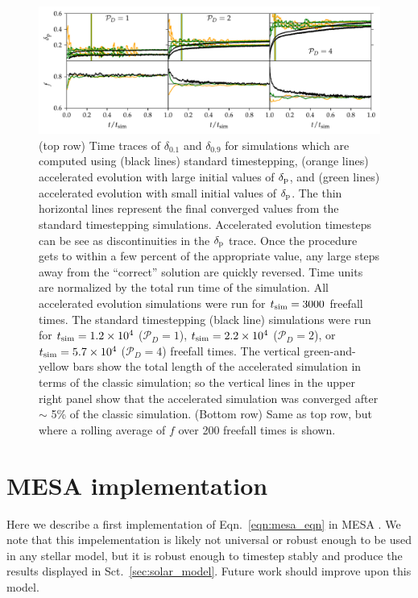 \documentclass[twocolumn]{aastex631}
\newcommand{\delp}{\ensuremath{\delta_{\rm{p}}}}
\newcommand{\mP}{\ensuremath{\mathcal{P}}}
\begin{document}
\begin{figure}[t!]
\centering
\includegraphics[width=\textwidth]{AE_time_figure.pdf}
\caption{
\label{fig:AE_time_figure}
(top row) Time traces of $\delta_{0.1}$ and $\delta_{0.9}$ for simulations which are computed using (black lines) standard timestepping, (orange lines) accelerated evolution with large initial values of $\delp$, and (green lines) accelerated evolution with small initial values of $\delp$.
The thin horizontal lines represent the final converged values from the standard timestepping simulations.
Accelerated evolution timesteps can be see as discontinuities in the $\delp$ trace.
Once the procedure gets to within a few percent of the appropriate value, any large steps away from the ``correct'' solution are quickly reversed.
Time units are normalized by the total run time of the simulation.
All accelerated evolution simulations were run for $t_{\rm{sim}} = 3000$ freefall times.
The standard timestepping (black line) simulations were run for $t_{\rm{sim}} = 1.2 \times 10^4$ ($\mP_D = 1$), $t_{\rm{sim}} = 2.2 \times 10^4$ ($\mP_D = 2$), or $t_{\rm{sim}} = 5.7 \times 10^4$ ($\mP_D = 4$) freefall times.
The vertical green-and-yellow bars show the total length of the accelerated simulation in terms of the classic simulation; so the vertical lines in the upper right panel show that the accelerated simulation was converged after $\sim$ 5\% of the classic simulation.
(Bottom row) Same as top row, but where a rolling average of $f$ over 200 freefall times is shown.
}
\end{figure}





\section{MESA implementation}
\label{app:mesa}
Here we describe a first implementation of Eqn.~\ref{eqn:mesa_eqn} in MESA \citep{paxton_etal_2011, paxton_etal_2013, paxton_etal_2015, paxton_etal_2018, paxton_etal_2019}.
We note that this impelementation is likely not universal or robust enough to be used in any stellar model, but it is robust enough to timestep stably and produce the results displayed in Sct.~\ref{sec:solar_model}.
Future work should improve upon this model.
\end{document}
